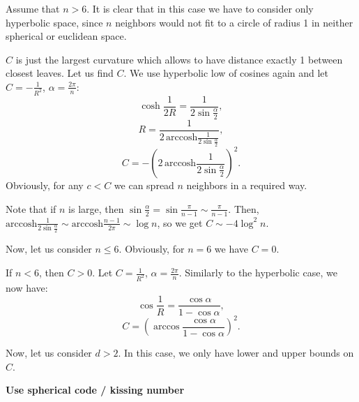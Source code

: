 \documentclass{article} %
\begin{document}
Assume that $n > 6$. It is clear that in this case we have to consider only hyperbolic space, since $n$ neighbors would not fit to a circle of radius 1 in neither spherical or euclidean space.

$C$ is just the largest curvature which allows to have distance exactly 1 between closest leaves. Let us find $C$. We use hyperbolic low of cosines again and let $C = -\frac{1}{R^2}$, $\alpha = \frac{2\pi}{n}$:
\[
\cosh\frac{1}{2R} = \frac{1}{2\sin \frac{\alpha}{2}},
\]
\[
R = \frac{1}{2\,\textrm{arccosh}\frac{1}{2\sin \frac{\alpha}{2}}},
\]
\[
C = - \left(2\,\textrm{arccosh}\frac{1}{2\sin \frac{\alpha}{2}}\right)^2.
\]
Obviously, for any $c < C$ we can spread $n$ neighbors in a required way.

Note that if $n$ is large, then $\sin \frac{\alpha}{2} = \sin\frac{\pi}{n-1} \sim \frac{\pi}{n-1}$. Then,  $\textrm{arccosh}\frac{1}{2\sin \frac{\alpha}{2}} \sim \textrm{arccosh}\frac{n-1}{2\pi} \sim \log n$, so we get $C \sim - 4 \log^2 n$. 

Now, let us consider $n \le 6$. Obviously, for $n = 6$ we have $C = 0$.

If $n < 6$, then $C > 0$. Let $C = \frac{1}{R^2}$, $\alpha = \frac{2\pi}{n}$. Similarly to the hyperbolic case, we now have:
\[
\cos{\frac{1}{R}} = \frac{\cos \alpha}{1 - \cos \alpha},
\]
\[
C = \left(\arccos \frac{\cos \alpha}{1 - \cos \alpha}\right)^2.
\]

Now, let us consider $d > 2$. In this case, we only have lower and upper bounds on $C$. 

\textbf{Use spherical code / kissing number} 


\end{document}
